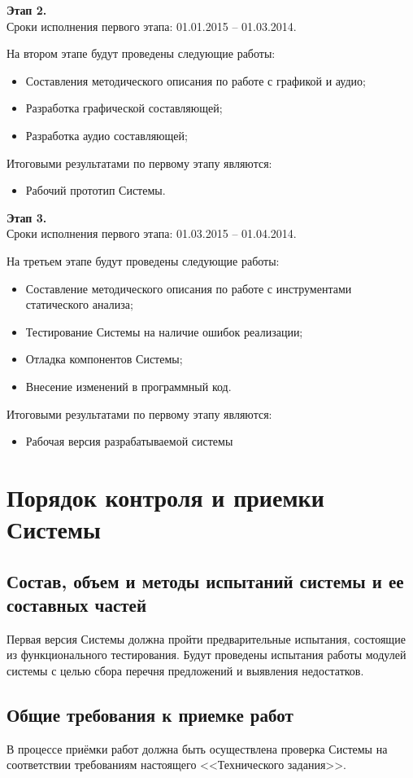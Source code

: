 \textbf{Этап 2.}\\
Сроки исполнения первого этапа: 01.01.2015 -- 01.03.2014.

На втором этапе будут проведены следующие работы:
\begin{itemize}
    \item Составления методического описания по работе с графикой и аудио;
    \item Разработка графической составляющей;
    \item Разработка аудио составляющей;
\end{itemize}
Итоговыми результатами по первому этапу являются:
\begin{itemize}
    \item Рабочий прототип Системы.
\end{itemize}

\textbf{Этап 3.}\\
Сроки исполнения первого этапа: 01.03.2015 -- 01.04.2014.

На третьем этапе будут проведены следующие работы:
\begin{itemize}
    \item Составление методического описания по работе с инструментами статического анализа;
    \item Тестирование Системы на наличие ошибок реализации;
    \item Отладка компонентов Системы;
    \item Внесение изменений в программный код.
\end{itemize}
Итоговыми результатами по первому этапу являются:
\begin{itemize}
    \item Рабочая версия разрабатываемой системы
\end{itemize}

\chapter{Порядок контроля и приемки Системы}
\section{Состав, объем и методы испытаний системы и ее составных частей}
Первая версия Системы должна пройти предварительные испытания, состоящие из функционального 
тестирования. Будут проведены испытания работы модулей системы с целью сбора перечня 
предложений и выявления недостатков. 

\section{Общие требования к приемке работ}
В процессе приёмки работ должна быть осуществлена проверка Системы на соответствии требованиям 
настоящего <<Технического задания>>.


